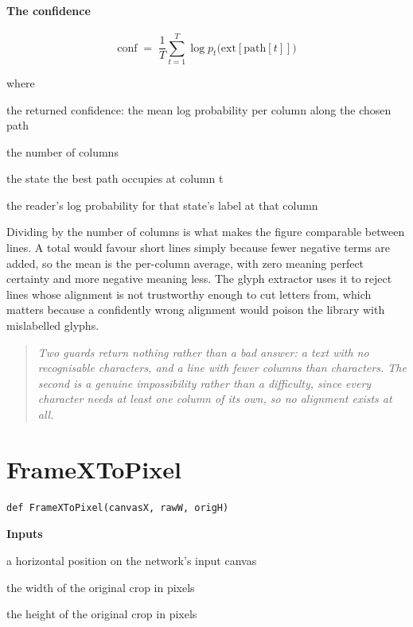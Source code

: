 \paragraph{The confidence}

\begin{equation}
\mathrm{conf} \;=\; \frac{1}{T} \sum_{t=1}^{T} \log p_t\big(\mathrm{ext}[\mathrm{path}[t]]\big)
\end{equation}

\noindent where
\begin{description}[leftmargin=2.4em,style=nextline,font=\normalfont\ttfamily]\setlength\itemsep{1pt}
  \item[{$\mathrm{conf}$}] \normalfont the returned confidence: the mean log probability per column along the chosen path
  \item[{$T$}] \normalfont the number of columns
  \item[{$\mathrm{path}[t]$}] \normalfont the state the best path occupies at column t
  \item[{$\log p_t(\cdot)$}] \normalfont the reader's log probability for that state's label at that column
\end{description}
Dividing by the number of columns is what makes the figure comparable between lines. A total would favour short lines simply because fewer negative terms are added, so the mean is the per-column average, with zero meaning perfect certainty and more negative meaning less. The glyph extractor uses it to reject lines whose alignment is not trustworthy enough to cut letters from, which matters because a confidently wrong alignment would poison the library with mislabelled glyphs.


\begin{quote}\small\itshape Two guards return nothing rather than a bad answer: a text with no recognisable characters, and a line with fewer columns than characters. The second is a genuine impossibility rather than a difficulty, since every character needs at least one column of its own, so no alignment exists at all.\end{quote}

\section{FrameXToPixel}
\begin{lstlisting}[style=sig]
def FrameXToPixel(canvasX, rawW, origH)
\end{lstlisting}

\noindent\textbf{Inputs}
\begin{description}[leftmargin=2.2em,style=nextline,font=\normalfont\ttfamily]\setlength\itemsep{1pt}
  \item[{canvasX}] \normalfont a horizontal position on the network's input canvas
  \item[{rawW}] \normalfont the width of the original crop in pixels
  \item[{origH}] \normalfont the height of the original crop in pixels
\end{description}

